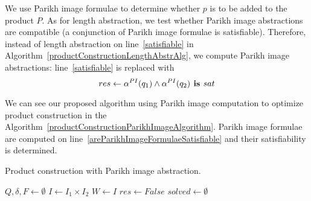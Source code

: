 We use Parikh image formulae to determine whether $p$ is to be added to the product $P$. As for length abstraction, we test whether Parikh image abstractions are compatible (a conjunction of Parikh image formulae is satisfiable). Therefore, instead of length abstraction on line~\ref{satisfiable} in Algorithm~\ref{productConstructionLengthAbstrAlg}, we compute Parikh image abstractions: line~\ref{satisfiable}  is replaced with
\[
    res \gets \alpha^{PI}(q_1) \land \alpha^{PI}(q_2) \textbf{ is } sat
\]

We can see our proposed algorithm using Parikh image computation to optimize product construction in the Algorithm~\ref{productConstructionParikhImageAlgorithm}. Parikh image formulae are computed on line~\ref{areParikhImageFormulaeSatisfiable} and their satisfiability is determined.

\begin{algorithm}
\caption{Product construction with Parikh image abstraction.}\label{productConstructionParikhImageAlgorithm}
\DontPrintSemicolon
{}
\BlankLine
$Q, \delta, F \gets \emptyset$ \;
$I \gets I_1 \times I_2$ \;
$W \gets I$ \;
$res \gets False$ \;
$solved \gets \emptyset$ \;\label{PIAlgorithm:solved}
\end{algorithm}

